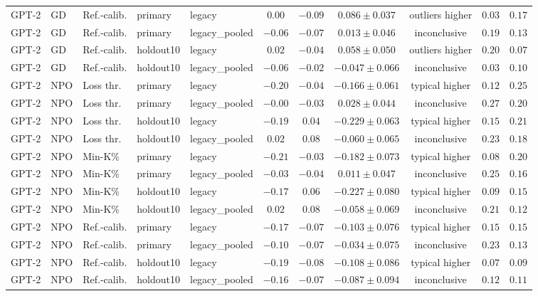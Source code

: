 {\begin{longtable}{@{\extracolsep{\fill}}lllllcccccc@{}}
GPT-2 & GD & Ref.-calib. & primary & legacy & $0.00$ & $-0.09$ & $0.086 \pm 0.037$ & outliers higher & $0.03$ & $0.17$ \\
GPT-2 & GD & Ref.-calib. & primary & legacy\_pooled & $-0.06$ & $-0.07$ & $0.013 \pm 0.046$ & inconclusive & $0.19$ & $0.13$ \\
GPT-2 & GD & Ref.-calib. & holdout10 & legacy & $0.02$ & $-0.04$ & $0.058 \pm 0.050$ & outliers higher & $0.20$ & $0.07$ \\
GPT-2 & GD & Ref.-calib. & holdout10 & legacy\_pooled & $-0.06$ & $-0.02$ & $-0.047 \pm 0.066$ & inconclusive & $0.03$ & $0.10$ \\
GPT-2 & NPO & Loss thr. & primary & legacy & $-0.20$ & $-0.04$ & $-0.166 \pm 0.061$ & typical higher & $0.12$ & $0.25$ \\
GPT-2 & NPO & Loss thr. & primary & legacy\_pooled & $-0.00$ & $-0.03$ & $0.028 \pm 0.044$ & inconclusive & $0.27$ & $0.20$ \\
GPT-2 & NPO & Loss thr. & holdout10 & legacy & $-0.19$ & $0.04$ & $-0.229 \pm 0.063$ & typical higher & $0.15$ & $0.21$ \\
GPT-2 & NPO & Loss thr. & holdout10 & legacy\_pooled & $0.02$ & $0.08$ & $-0.060 \pm 0.065$ & inconclusive & $0.23$ & $0.18$ \\
GPT-2 & NPO & Min-K\% & primary & legacy & $-0.21$ & $-0.03$ & $-0.182 \pm 0.073$ & typical higher & $0.08$ & $0.20$ \\
GPT-2 & NPO & Min-K\% & primary & legacy\_pooled & $-0.03$ & $-0.04$ & $0.011 \pm 0.047$ & inconclusive & $0.25$ & $0.16$ \\
GPT-2 & NPO & Min-K\% & holdout10 & legacy & $-0.17$ & $0.06$ & $-0.227 \pm 0.080$ & typical higher & $0.09$ & $0.15$ \\
GPT-2 & NPO & Min-K\% & holdout10 & legacy\_pooled & $0.02$ & $0.08$ & $-0.058 \pm 0.069$ & inconclusive & $0.21$ & $0.12$ \\
GPT-2 & NPO & Ref.-calib. & primary & legacy & $-0.17$ & $-0.07$ & $-0.103 \pm 0.076$ & typical higher & $0.15$ & $0.15$ \\
GPT-2 & NPO & Ref.-calib. & primary & legacy\_pooled & $-0.10$ & $-0.07$ & $-0.034 \pm 0.075$ & inconclusive & $0.23$ & $0.13$ \\
GPT-2 & NPO & Ref.-calib. & holdout10 & legacy & $-0.19$ & $-0.08$ & $-0.108 \pm 0.086$ & typical higher & $0.07$ & $0.09$ \\
GPT-2 & NPO & Ref.-calib. & holdout10 & legacy\_pooled & $-0.16$ & $-0.07$ & $-0.087 \pm 0.094$ & inconclusive & $0.12$ & $0.11$ \\

\end{longtable}}
